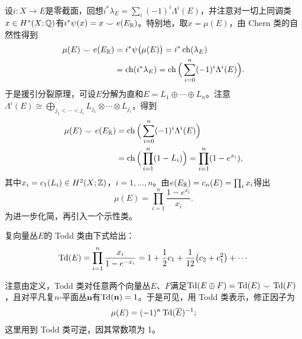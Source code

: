 设$i:X\to E$是零截面，回想$i^*\lambda_E=\sum_i(-1)^i\Lambda^i(E)$，并注意对一切上同调类$x\in H^*(X;\mathbb{Q})$有$i^*\psi(x)=x\smile e(E_{\mathbb{R}})$。特别地，取$x=\mu(E)$，由 Chern 类的自然性得到
\begin{align*}
\mu(E)\smile e(E_{\mathbb{R}})&=i^*\psi\big(\mu(E)\big)=i^*\operatorname{ch}(\lambda_E)\\
&=\operatorname{ch}(i^*\lambda_E)=\operatorname{ch}\Big(\sum_{i=0}^n(-1)^i\Lambda^i(E)\Big).
\end{align*}
于是援引分裂原理，可设$E$分解为直和$E=L_1\oplus\cdots\oplus L_n$。注意$\Lambda^i(E)\cong\bigoplus_{j_1<\cdots<j_i}L_{j_1}\otimes\cdots\otimes L_{j_i}$，得到
\begin{align*}
\mu(E)\smile e(E_{\mathbb{R}})&=\operatorname{ch}\Big(\sum_{i=0}^n(-1)^i\Lambda^i(E)\Big)\\
&=\operatorname{ch}\Big(\prod_{i=1}^n(1-L_i)\Big)=\prod_{i=1}^n(1-e^{x_i}),
\end{align*}
其中$x_i=c_1(L_i)\in H^2(X;\mathbb{Z})$，$i=1,\ldots,n$。由$e(E_{\mathbb{R}})=c_n(E)=\prod_i x_i$得出
\[
\mu(E)=\prod_{i=1}^n\frac{1-e^{x_i}}{x_i}.
\]
为进一步化简，再引入一个示性类。

\begin{definition}
复向量丛$E$的 Todd 类由下式给出：
\[
\operatorname{Td}(E)=\prod_{i=1}^n\frac{x_i}{1-e^{-x_i}}=1+\frac12c_1+\frac{1}{12}\big(c_2+c_1^2\big)+\cdots
\]
\end{definition}

注意由定义，Todd 类对任意两个向量丛$E$、$F$满足$\operatorname{Td}(E\oplus F)=\operatorname{Td}(E)\smile\operatorname{Td}(F)$，且对平凡复$n$-平面丛$\mathbf{n}$有$\operatorname{Td}(\mathbf{n})=1$。于是可见，用 Todd 类表示，修正因子为
\[
\mu(E)=(-1)^n\operatorname{Td}(\overline{E})^{-1};
\]
这里用到 Todd 类可逆，因其常数项为 1。

